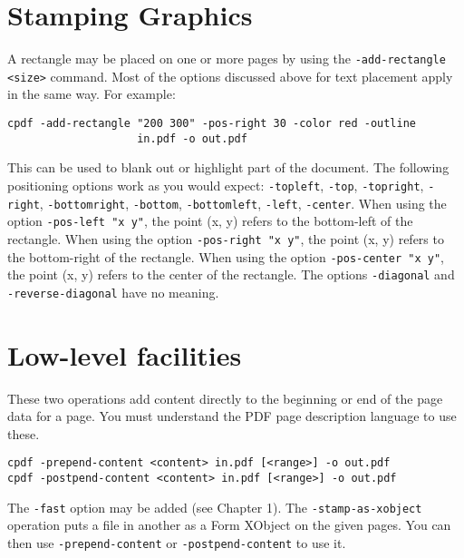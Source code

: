 \documentclass{book}
\begin{document}
\section{Stamping Graphics}

A rectangle may be placed on one or more pages by using the \texttt{-add-rectangle <size>} command. Most of the options discussed above for text placement apply in the same way. For example:

\begin{framed}
  \small\begin{verbatim}cpdf -add-rectangle "200 300" -pos-right 30 -color red -outline
                    in.pdf -o out.pdf\end{verbatim}
\end{framed}

\noindent This can be used to blank out or highlight part of the document. The following positioning options work as you would expect: \texttt{-topleft}, \texttt{-top}, \texttt{-topright}, \texttt{-right}, \texttt{-bottomright}, \texttt{-bottom}, \texttt{-bottomleft}, \texttt{-left}, \texttt{-center}. When using the option \texttt{-pos-left "x y"}, the point (x, y) refers to the bottom-left of the rectangle. When using the option \texttt{-pos-right "x y"}, the point (x, y) refers to the bottom-right of the rectangle. When using the option \texttt{-pos-center "x y"}, the point (x, y) refers to the center of the rectangle. The options \texttt{-diagonal} and \texttt{-reverse-diagonal} have no meaning.\pagestyle{empty}\thispagestyle{fancy}

\section{Low-level facilities}

These two operations add content directly to the beginning or end of the page data for a page. You must understand the PDF page description language to use these.

\begin{framed}
  \noindent\small\verb!cpdf -prepend-content <content> in.pdf [<range>] -o out.pdf!\\

\vspace{1.5mm}
  \noindent\small\verb!cpdf -postpend-content <content> in.pdf [<range>] -o out.pdf!
\end{framed}

\noindent The \texttt{-fast} option may be added (see Chapter 1). The \texttt{-stamp-as-xobject} operation puts a file in another as a Form XObject on the given pages. You can then use \texttt{-prepend-content} or \texttt{-postpend-content} to use it.
\end{document}
